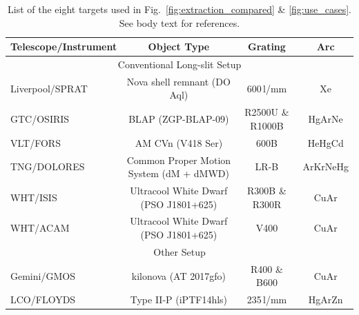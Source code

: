 \documentclass[linenumbers, twocolumn]{aastex631}
\begin{document}
\begin{table}
    \centering
    \begin{tabular}{l|c|c|c}\hline
        Telescope/Instrument & Object Type                                 & Grating             & Arc \\\hline\hline
        \multicolumn{4}{c}{Conventional Long-slit Setup}\\\hline
        Liverpool/SPRAT      & Nova shell remnant (DO Aql)                 & 600\,l/mm           & Xe \\
        GTC/OSIRIS           & BLAP (ZGP-BLAP-09)                          & R2500U \& R1000B    & HgArNe \\
        VLT/FORS             & AM CVn (V418 Ser)                           & 600B                & HeHgCd \\
        TNG/DOLORES          & Common Proper Motion System (dM + dMWD)     & LR-B                & ArKrNeHg \\
        WHT/ISIS             & Ultracool White Dwarf (PSO J1801+625)       & R300B \& R300R      & CuAr \\
        WHT/ACAM             & Ultracool White Dwarf (PSO J1801+625)       & V400                & CuAr \\\hline
        \multicolumn{4}{c}{Other Setup}\\\hline
        Gemini/GMOS          & kilonova (AT 2017gfo)                       & R400 \& B600        & CuAr \\
        LCO/FLOYDS           & Type II-P (iPTF14hls)                       & 235\,l/mm           & HgArZn \\\hline
\end{tabular}
    \caption{List of the eight targets used in Fig.~\ref{fig:extraction_compared} \& \ref{fig:use_cases}. See body text for references.}
    \label{tab:my_label}
\end{table}
\end{document}
